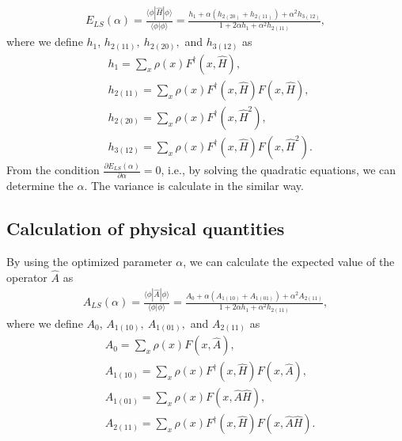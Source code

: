 \begin{align}
E_{LS}(\alpha) =\frac{\langle \phi| \hat{H} |\phi\rangle}{\langle \phi|\phi\rangle}=\frac{h_1 + \alpha(h_{2(20)} + h_{2(11)}) + \alpha^2 h_{3(12)}}{1 + 2\alpha h_1 + \alpha^2 h_{2(11)}},
\end{align}
where we define $h_1$, $h_{2(11)},~h_{2(20)},$ and $h_{3(12)}$ as
\begin{align}
&h_1 =\sum_{x} \rho(x) F^{\dag}(x,  \hat{H}),\\
&h_{2(11)}=\sum_{x} \rho(x) F^{\dag}(x,  \hat{H}) F(x, \hat{H}),\\
&h_{2(20)}=\sum_{x} \rho(x) F^{\dag}(x,  \hat{H}^2),\\
&h_{3(12)}=\sum_{x} \rho(x) F^{\dag}(x,  \hat{H})F(x,  \hat{H}^2).
\end{align}
From the condition $\frac{\partial E_{LS}(\alpha)}{\partial \alpha}=0$, i.e., by solving the quadratic equations, we can determine the
 $\alpha$. The variance is calculate in the similar way.
\subsection{Calculation of physical quantities}
 By using the optimized parameter $\alpha$, we can calculate the expected value of the operator $\hat{A}$ as 
\begin{align}
A_{LS}(\alpha) =\frac{\langle \phi| \hat{A} |\phi\rangle}{\langle \phi|\phi\rangle}=\frac{A_0 + \alpha(A_{1(10)} + A_{1(01)}) + \alpha^2 A_{2(11)}}{1 + 2\alpha h_1 + \alpha^2 h_{2(11)}},
\end{align}
where we define $A_0$, $A_{1(10)},~A_{1(01)},$ and $A_{2(11)}$ as
\begin{align}
&A_0 =\sum_{x} \rho(x) F(x,  \hat{A}),\\
&A_{1(10)}=\sum_{x} \rho(x) F^{\dag}(x,  \hat{H}) F(x, \hat{A}),\\
&A_{1(01)}=\sum_{x} \rho(x) F(x, \hat{A}\hat{H}),\\
&A_{2(11)}=\sum_{x} \rho(x) F^{\dag}(x,  \hat{H})F(x,  \hat{A}\hat{H}).
\end{align}

